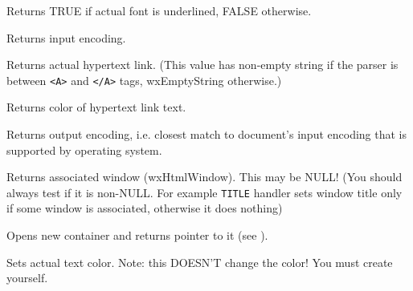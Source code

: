 Returns TRUE if actual font is underlined, FALSE otherwise.

\label{wxhtmlwinparsergetinputencoding}


Returns input encoding.


\label{wxhtmlwinparsergetlink}


Returns actual hypertext link. (This value has non-empty
 string
if the parser is between {\tt <A>} and {\tt </A>} tags,
wxEmptyString otherwise.)


\label{wxhtmlwinparsergetlinkcolor}


Returns color of hypertext link text.


\label{wxhtmlwinparsergetoutputencoding}


Returns output encoding, i.e. closest match to document's input encoding
that is supported by operating system.

\label{wxhtmlwinparsergetwindow}


Returns associated window (wxHtmlWindow). This may be NULL! (You should always
test if it is non-NULL. For example {\tt TITLE} handler sets window
title only if some window is associated, otherwise it does nothing)


\label{wxhtmlwinparseropencontainer}


Opens new container and returns pointer to it (see ).


\label{wxhtmlwinparsersetactualcolor}


Sets actual text color. Note: this DOESN'T change the color!
You must create  yourself.

